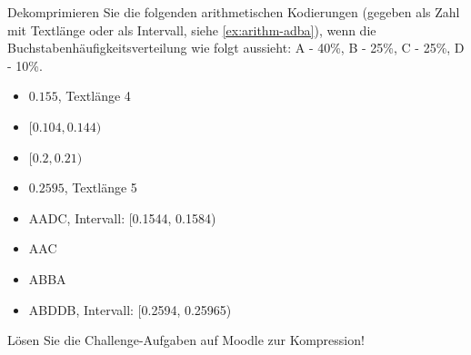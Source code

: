 \begin{myexercise}
	Dekomprimieren Sie die folgenden arithmetischen Kodierungen (gegeben als Zahl mit Textlänge oder als Intervall, siehe \cref{ex:arithm-adba}), wenn die Buchstabenhäufigkeitsverteilung wie folgt aussieht: A - 40\%, B - 25\%, C - 25\%, D - 10\%.
	\begin{itemize}
		\item $0.155$, Textlänge 4
		\item $[0.104, 0.144)$
		\item $[0.2, 0.21)$
		\item $0.2595$, Textlänge 5
	\end{itemize}
	\begin{myanswer}
		\begin{itemize}
			\item AADC, Intervall: [0.1544, 0.1584)
			\item AAC
			\item ABBA
			\item ABDDB, Intervall: [0.2594, 0.25965)
		\end{itemize}
	\end{myanswer}
\end{myexercise}

\begin{mychallenge}
	Lösen Sie die Challenge-Aufgaben auf Moodle zur Kompression!
\end{mychallenge}